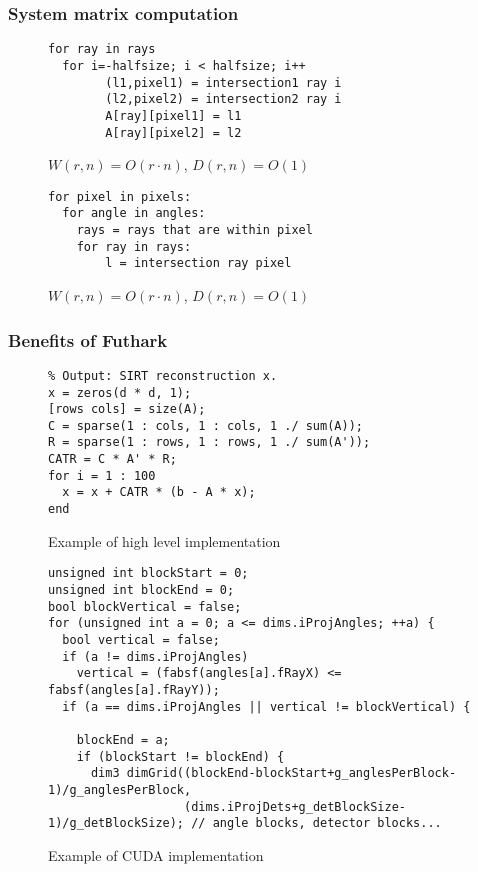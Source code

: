 \documentclass{beamer}
\begin{document}
\begin{frame}[fragile]
\frametitle{System matrix computation}
\begin{figure}[!h]
\begin{lstlisting}[frame=single]
for ray in rays
  for i=-halfsize; i < halfsize; i++
        (l1,pixel1) = intersection1 ray i
        (l2,pixel2) = intersection2 ray i
        A[ray][pixel1] = l1
        A[ray][pixel2] = l2
\end{lstlisting}
  \caption{$W(r,n)=O(r\cdot n)$, $D(r,n)=O(1)$}
\end{figure}
\begin{figure}[!h]
\begin{lstlisting}[frame=single]
for pixel in pixels:
  for angle in angles:
    rays = rays that are within pixel
    for ray in rays:
        l = intersection ray pixel
\end{lstlisting}
  \caption{$W(r,n)=O(r\cdot n)$, $D(r,n)=O(1)$}
\end{figure}
\end{frame}

\begin{frame}[fragile]
\frametitle{Benefits of Futhark}
\begin{figure}[!h]
\begin{lstlisting}[frame=single]
% Input: sparse system matrix A, data b.
% Output: SIRT reconstruction x.
x = zeros(d * d, 1);
[rows cols] = size(A);
C = sparse(1 : cols, 1 : cols, 1 ./ sum(A));
R = sparse(1 : rows, 1 : rows, 1 ./ sum(A'));
CATR = C * A' * R;
for i = 1 : 100
  x = x + CATR * (b - A * x);
end
\end{lstlisting}
  \caption{Example of high level implementation}
\end{figure}
\end{frame}

\begin{frame}[fragile]
\begin{figure}[!h]
\begin{lstlisting}[frame=single]
unsigned int blockStart = 0;
unsigned int blockEnd = 0;
bool blockVertical = false;
for (unsigned int a = 0; a <= dims.iProjAngles; ++a) {
  bool vertical = false;
  if (a != dims.iProjAngles)
    vertical = (fabsf(angles[a].fRayX) <= fabsf(angles[a].fRayY));
  if (a == dims.iProjAngles || vertical != blockVertical) {

    blockEnd = a;
    if (blockStart != blockEnd) {
      dim3 dimGrid((blockEnd-blockStart+g_anglesPerBlock-1)/g_anglesPerBlock,
                   (dims.iProjDets+g_detBlockSize-1)/g_detBlockSize); // angle blocks, detector blocks...
\end{lstlisting}
  \caption{Example of CUDA implementation}
\end{figure}
\end{frame}
\end{document}
